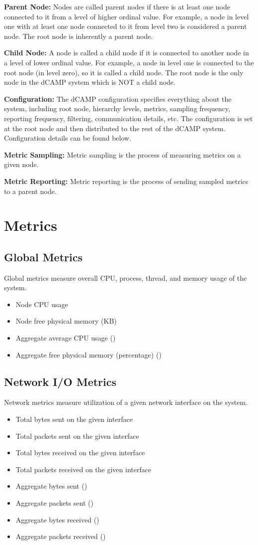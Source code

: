 \textbf{Parent Node:} Nodes are called parent nodes if there is at least one node connected to it from a level of higher ordinal value. For example, a node in level one with at least one node connected to it from level two is considered a parent node. The root node is inherently a parent node. 

\textbf{Child Node:} A node is called a child node if it is connected to another node in a level of lower ordinal value. For example, a node in level one is connected to the root node (in level zero), so it is called a child node. The root node is the only node in the dCAMP system which is NOT a child node. 

\textbf{Configuration:} The dCAMP configuration specifies everything about the system, including root node, hierarchy levels, metrics, sampling frequency, reporting frequency, filtering, communication details, etc. The configuration is set at the root node and then distributed to the rest of the dCAMP system. Configuration details can be found below. 

\textbf{Metric Sampling:} Metric sampling is the process of measuring metrics on a given node. 

\textbf{Metric Reporting:} Metric reporting is the process of sending sampled metrics to a parent node.

\section{\dcamp Metrics}
\subsection{Global Metrics}
Global metrics measure overall CPU, process, thread, and memory usage of the system.
\begin{itemize}
\item Node CPU usage 
\item Node free physical memory (KB) 
\item Aggregate average CPU usage (\dcamp) 
\item Aggregate free physical memory (percentage) (\dcamp)
\end{itemize}

\subsection{Network I/O Metrics}
Network metrics measure utilization of a given network interface on the system.
\begin{itemize}
\item Total bytes sent on the given interface 
\item Total packets sent on the given interface 
\item Total bytes received on the given interface 
\item Total packets received on the given interface 
\item Aggregate bytes sent (\dcamp) 
\item Aggregate packets sent (\dcamp) 
\item Aggregate bytes received (\dcamp) 
\item Aggregate packets received (\dcamp)
\end{itemize}

